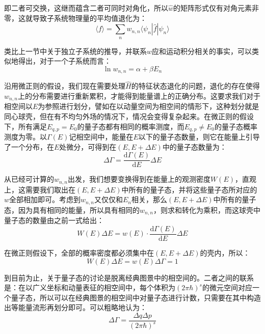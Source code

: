 \documentclass[UTF8]{ctexart}
\begin{document}
\begin{spacing}{2.0}
即二者可交换，这继而蕴含二者可同时对角化，所以$\hat{w}$的矩阵形式仅有对角元素非零，这就导致子系统物理量的平均值退化为：
\begin{equation}
\langle f\rangle = \sum_{n} w_{n,n} \langle \psi_{n} |\hat{f}|\psi_{n} \rangle
\end{equation}

类比上一节中关于独立子系统的推导，并联系$w$应和运动积分相关的事实，可以类似地得出，对于一个子系统而言：
\begin{equation}
\ln w_{n,n}=\alpha+\beta E_{n}
\end{equation}

沿用微正则的假设，我们现在需要处理$\hat{H}$的特征状态退化的问题，退化的存在使得$w_{n,n}$上的分布需要进行重新累积，才能得到能量谱上的正确分布。这要求我们对于相空间以$E$为参照进行划分，譬如在以动量空间为相空间的情形下，这种划分就是同心球壳，但在有不均匀外场的情况下，情况会变得复杂起来。在微正则的假设下，所有满足$E_{q,p}=E_{0}$的量子态都有相同的概率测度，而$E_{q,p}\neq E_{0}$的量子态概率测度为零。以$\Gamma(E)$记相空间中，能量在$E$以下的量子态数量，则它在能量上引导了一个分布，在$E$处微分，可得到在$(E,E+\Delta E)$中的量子态数量为：
\begin{equation}
\Delta\Gamma= \frac{\text{d} \Gamma(E)}{\text{d} E} \Delta E
\end{equation}

从已经可计算的$w_{n,n}$出发，我们想要变换得到在能量上的观测密度$W(E)$，直观上，这需要我们取出在$(E,E+\Delta E)$中所有的量子态，并将这些量子态所对应的$w$全部相加即可。考虑到$w_{n,n}$又仅仅和$E_{n}$相关，那么$(E,E+\Delta E)$中所有的量子态，因为具有相同的能量，所以具有相同的$w_{n,n}$，则求和转化为乘积，而这球壳中量子态的数量由之前一式给出：
\begin{equation}
W(E)\Delta E = w(E)\cdot\frac{\text{d} \Gamma(E)}{\text{d} E} \Delta E 
\end{equation}

在微正则假设下，全部的概率密度都必须集中在$(E,E+\Delta E)$的壳内，所以：
\begin{equation}
W(E)\Delta E = w(E)\Delta \Gamma = 1
\end{equation}

到目前为止，关于量子态的讨论是脱离经典图景中的相空间的。二者之间的联系是：在以广义坐标和动量表征的相空间中，每个体积为$(2\pi\hbar)^{s}$的微元空间对应一个量子态，所以可以在经典图景的相空间中对量子态进行计数，只需要在其中构造出等能量流形再划分即可。可以粗略地认为：
\begin{equation}
\Delta \Gamma = \frac{\Delta q \Delta p}{(2\pi\hbar)^{s}}
\end{equation}




\end{spacing}
\end{document}
